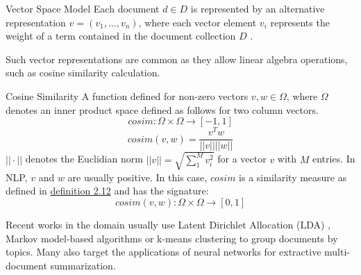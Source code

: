 \begin{definition}{Vector Space Model}
\label{VSM}
Each document $d \in D$ is represented by an alternative representation $v = (v_1,...,v_n)$, where each vector element $v_i$ represents the weight of a term contained in the document collection $D$ \cite{Salton:1975:VSM:361219.361220}.
\end{definition}
Such vector representations are common as they allow linear algebra operations, such as cosine similarity calculation. 

\begin{definition}{Cosine Similarity}
\label{CoS}
A function defined for non-zero vectors $v,w \in \Omega$, where $\Omega$ denotes an inner product space defined as follows for two column vectors.
\begin{equation}
cosim : \Omega \times \Omega \rightarrow [-1,1]
\end{equation}
\begin{equation}
cosim(v,w) = \frac{v^Tw}{||v|| ||w||}
\end{equation}
$||\cdot||$ denotes the Euclidian norm $||v|| = \sqrt{\sum_{1}^{M} v_i^{2}}$ for a vector $v$ with $M$ entries.
In NLP, $v$ and $w$ are usually positive. In this case, $cosim$ is a similarity measure as defined in \hyperref[SIM]{definition 2.12} and has the signature:
\begin{equation}
cosim(v,w) : \Omega \times \Omega \rightarrow [0,1]
\end{equation}
\end{definition}
Recent works in the domain usually use Latent Dirichlet Allocation (LDA) \cite{DBLP:conf/cikm/MaSYC12, llewellyn_grover_oberlander, DBLP:conf/icwsm/KhabiriCH11, Arora:2008:LDA:1390749.1390764}, Markov model-based algorithms \cite{DBLP:conf/lrec/BarkerPFKAFHG16} or k-means clustering \cite{Wan:2008:MSU:1390334.1390386, llewellyn_grover_oberlander} to group documents by topics.
Many \cite{Cao:2015:RRN:2886521.2886620, Zhang2016, Yasunaga2017, Ren:2018:SRE:3211967.3200864} also target the applications of neural networks for extractive multi-document summarization.


